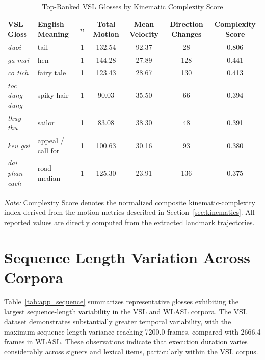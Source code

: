 \documentclass{ieeeaccess}
\DeclareRobustCommand{\textbf}[1]{{\bfseries #1}}
\begin{document}
\begin{table}[!t]
\caption{Top-Ranked VSL Glosses by Kinematic Complexity Score}
\label{tab:app_kinematic}
\centering
\small
\setlength{\tabcolsep}{5pt}

\begin{tabular}{llccccc}
\toprule
\textbf{VSL Gloss} &
\textbf{English Meaning} &
\textbf{$n$} &
\textbf{Total Motion} &
\textbf{Mean Velocity} &
\textbf{Direction Changes} &
\textbf{Complexity Score} \\
\midrule

\textit{duoi} &
tail &
1 &
132.54 &
92.37 &
28 &
0.806 \\

\textit{ga mai} &
hen &
1 &
144.28 &
27.89 &
128 &
0.441 \\

\textit{co tich} &
fairy tale &
1 &
123.43 &
28.67 &
130 &
0.413 \\

\textit{toc dung dung} &
spiky hair &
1 &
90.03 &
35.50 &
66 &
0.394 \\

\textit{thuy thu} &
sailor &
1 &
83.08 &
38.30 &
48 &
0.391 \\

\textit{keu goi} &
appeal / call for &
1 &
100.63 &
30.16 &
93 &
0.380 \\

\textit{dai phan cach} &
road median &
1 &
125.30 &
23.91 &
136 &
0.375 \\

\bottomrule
\end{tabular}

\vspace{2mm}

\footnotesize
\textit{Note:} Complexity Score denotes the normalized composite kinematic-complexity index derived from the motion metrics described in Section~\ref{sec:kinematics}. All reported values are directly computed from the extracted landmark trajectories.

\end{table}

\vspace{-8pt}
\section{Sequence Length Variation Across Corpora}

Table~\ref{tab:app_sequence} summarizes representative glosses exhibiting the largest sequence-length variability in the VSL and WLASL corpora. The VSL dataset demonstrates substantially greater temporal variability, with the maximum sequence-length variance reaching 7200.0 frames, compared with 2666.4 frames in WLASL. These observations indicate that execution duration varies considerably across signers and lexical items, particularly within the VSL corpus.
\end{document}
